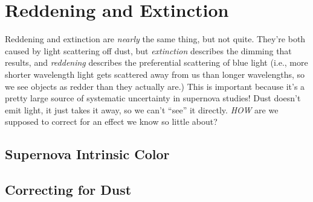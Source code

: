 \section{Reddening and Extinction}

Reddening and extinction are \textit{nearly} the same thing, but not quite. They're both caused by light scattering off dust, but \textit{extinction} describes the dimming that results, and \textit{reddening} describes the preferential scattering of blue light (i.e., more shorter wavelength light gets scattered away from us than longer wavelengths, so we see objects as redder than they actually are.) This is important because it's a pretty large source of systematic uncertainty in supernova studies! Dust doesn't emit light, it just takes it away, so we can't ``see'' it directly. \textit{HOW} are we supposed to correct for an effect we know so little about? 

\subsection{Supernova Intrinsic Color}

\subsection{Correcting for Dust}